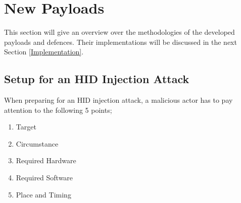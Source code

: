 \section{New Payloads}


This section will give an overview over the methodologies of the developed payloads and defences. Their implementations will be discussed in the next Section \ref{Implementation}. \\

\subsection{Setup for an HID Injection Attack}

When preparing for an HID injection attack, a malicious actor has to pay attention to the following 5 points;
\begin{enumerate}
    \item Target
    \item Circumstance 
    \item Required Hardware
    \item Required Software
    \item Place and Timing
\end{enumerate}

